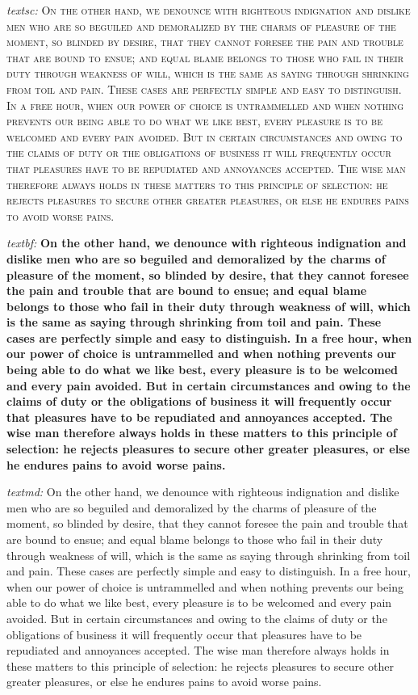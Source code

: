 \emph{textsc:}
\textsc{On the other hand, we denounce with righteous indignation and
  dislike men who are so beguiled and demoralized by the charms of
  pleasure of the moment, so blinded by desire, that they cannot
  foresee the pain and trouble that are bound to ensue; and equal
  blame belongs to those who fail in their duty through weakness of
  will, which is the same as saying through shrinking from toil and
  pain. These cases are perfectly simple and easy to distinguish. In a
  free hour, when our power of choice is untrammelled and when nothing
  prevents our being able to do what we like best, every pleasure is
  to be welcomed and every pain avoided. But in certain circumstances
  and owing to the claims of duty or the obligations of business it
  will frequently occur that pleasures have to be repudiated and
  annoyances accepted. The wise man therefore always holds in these
  matters to this principle of selection: he rejects pleasures to
  secure other greater pleasures, or else he endures pains to avoid
  worse pains.}

\emph{textbf:}
\textbf{On the other hand, we denounce with righteous indignation and
  dislike men who are so beguiled and demoralized by the charms of
  pleasure of the moment, so blinded by desire, that they cannot
  foresee the pain and trouble that are bound to ensue; and equal
  blame belongs to those who fail in their duty through weakness of
  will, which is the same as saying through shrinking from toil and
  pain. These cases are perfectly simple and easy to distinguish. In a
  free hour, when our power of choice is untrammelled and when nothing
  prevents our being able to do what we like best, every pleasure is
  to be welcomed and every pain avoided. But in certain circumstances
  and owing to the claims of duty or the obligations of business it
  will frequently occur that pleasures have to be repudiated and
  annoyances accepted. The wise man therefore always holds in these
  matters to this principle of selection: he rejects pleasures to
  secure other greater pleasures, or else he endures pains to avoid
  worse pains.} 

\emph{textmd:}
\textmd{On the other hand, we denounce with righteous indignation and
  dislike men who are so beguiled and demoralized by the charms of
  pleasure of the moment, so blinded by desire, that they cannot
  foresee the pain and trouble that are bound to ensue; and equal
  blame belongs to those who fail in their duty through weakness of
  will, which is the same as saying through shrinking from toil and
  pain. These cases are perfectly simple and easy to distinguish. In a
  free hour, when our power of choice is untrammelled and when nothing
  prevents our being able to do what we like best, every pleasure is
  to be welcomed and every pain avoided. But in certain circumstances
  and owing to the claims of duty or the obligations of business it
  will frequently occur that pleasures have to be repudiated and
  annoyances accepted. The wise man therefore always holds in these
  matters to this principle of selection: he rejects pleasures to
  secure other greater pleasures, or else he endures pains to avoid
  worse pains.}

